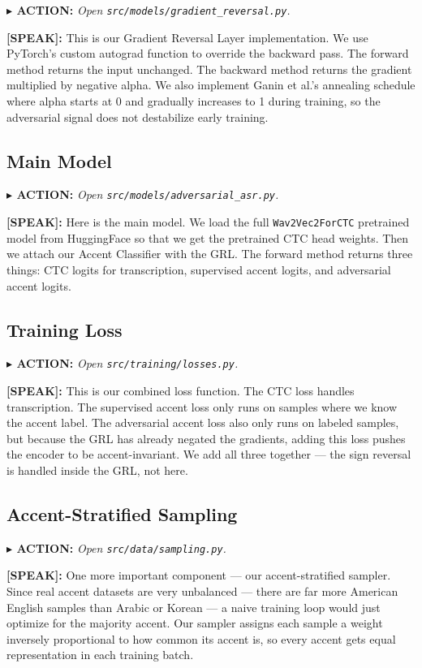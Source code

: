 \documentclass[12pt,a4paper]{article}
\newcommand{\say}[1]{%
  \begin{speakbox}
  \textbf{\color{speakblue}[SPEAK]:} #1
  \end{speakbox}
  \vspace{4pt}
}
\newcommand{\action}[1]{%
  \vspace{2pt}
  \noindent\textbf{\color{sectionred}$\blacktriangleright$ ACTION:} \textit{#1}
  \vspace{4pt}
}
\begin{document}
\action{Open \texttt{src/models/gradient\_reversal.py}.}

\say{This is our Gradient Reversal Layer implementation. We use PyTorch's custom autograd
function to override the backward pass. The forward method returns the input unchanged.
The backward method returns the gradient multiplied by negative alpha. We also implement
Ganin et al.'s annealing schedule where alpha starts at 0 and gradually increases to 1
during training, so the adversarial signal does not destabilize early training.}

\subsection{Main Model}

\action{Open \texttt{src/models/adversarial\_asr.py}.}

\say{Here is the main model. We load the full \texttt{Wav2Vec2ForCTC} pretrained model from
HuggingFace so that we get the pretrained CTC head weights. Then we attach our Accent
Classifier with the GRL. The forward method returns three things: CTC logits for transcription,
supervised accent logits, and adversarial accent logits.}

\subsection{Training Loss}

\action{Open \texttt{src/training/losses.py}.}

\say{This is our combined loss function. The CTC loss handles transcription. The supervised
accent loss only runs on samples where we know the accent label. The adversarial accent loss
also only runs on labeled samples, but because the GRL has already negated the gradients,
adding this loss pushes the encoder to be accent-invariant. We add all three together --- the
sign reversal is handled inside the GRL, not here.}

\subsection{Accent-Stratified Sampling}

\action{Open \texttt{src/data/sampling.py}.}

\say{One more important component --- our accent-stratified sampler. Since real accent datasets
are very unbalanced --- there are far more American English samples than Arabic or Korean ---
a naive training loop would just optimize for the majority accent. Our sampler assigns each
sample a weight inversely proportional to how common its accent is, so every accent gets
equal representation in each training batch.}
\end{document}
